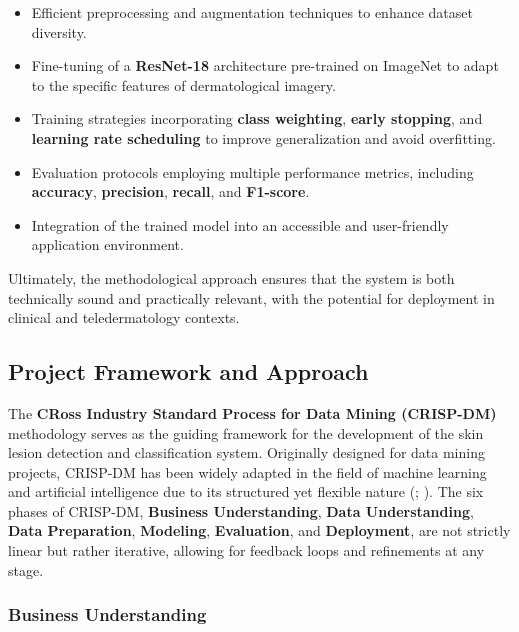 \documentclass[
  12pt,
  oneside]{article}
\providecommand{\tightlist}{%
  \setlength{\itemsep}{0pt}\setlength{\parskip}{0pt}}
\begin{document}
\begin{itemize}
\tightlist
\item
  Efficient preprocessing and augmentation techniques to enhance dataset
  diversity.
\item
  Fine-tuning of a \textbf{ResNet-18} architecture pre-trained on
  ImageNet to adapt to the specific features of dermatological imagery.
\item
  Training strategies incorporating \textbf{class weighting},
  \textbf{early stopping}, and \textbf{learning rate scheduling} to
  improve generalization and avoid overfitting.
\item
  Evaluation protocols employing multiple performance metrics, including
  \textbf{accuracy}, \textbf{precision}, \textbf{recall}, and
  \textbf{F1-score}.
\item
  Integration of the trained model into an accessible and user-friendly
  application environment.
\end{itemize}

Ultimately, the methodological approach ensures that the system is both
technically sound and practically relevant, with the potential for
deployment in clinical and teledermatology contexts.

\subsection{Project Framework and
Approach}\label{project-framework-and-approach}

The \textbf{CRoss Industry Standard Process for Data Mining (CRISP-DM)}
methodology serves as the guiding framework for the development of the
skin lesion detection and classification system. Originally designed for
data mining projects, CRISP-DM has been widely adapted in the field of
machine learning and artificial intelligence due to its structured yet
flexible nature (;
). The six
phases of CRISP-DM, \textbf{Business Understanding}, \textbf{Data
Understanding}, \textbf{Data Preparation}, \textbf{Modeling},
\textbf{Evaluation}, and \textbf{Deployment}, are not strictly linear
but rather iterative, allowing for feedback loops and refinements at any
stage.

\subsubsection{Business Understanding}\label{business-understanding}
\end{document}
